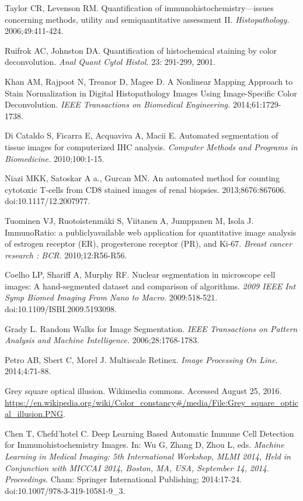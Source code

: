 \documentclass[12pt]{article}
\begin{document}
\noindent[24] Taylor CR, Levenson RM. Quantification of immunohistochemistry---issues concerning methods,
utility and semiquantitative assessment II. \textit{Histopathology.} 2006;49:411-424.

\noindent[25] Ruifrok AC, Johnston DA. Quantification of histochemical staining by color deconvolution. \textit{Anal
Quant Cytol Histol.} 23: 291-299, 2001.

\noindent[26] Khan AM, Rajpoot N, Treanor D, Magee D. A Nonlinear Mapping Approach to Stain
Normalization in Digital Histopathology Images Using Image-Specific Color Deconvolution. \textit{IEEE
Transactions on Biomedical Engineering.} 2014;61:1729-1738.

\noindent[27] Di Cataldo S, Ficarra E, Acquaviva A, Macii E. Automated segmentation of tissue images for
computerized IHC analysis. \textit{Computer Methods and Programs in Biomedicine.} 2010;100:1-15.

\noindent[28] Niazi MKK, Satoskar A a., Gurcan MN. An automated method for counting cytotoxic T-cells
from CD8 stained images of renal biopsies. 2013;8676:867606. doi:10.1117/12.2007977.

\noindent[29] Tuominen VJ, Ruotoistenmäki S, Viitanen A, Jumppanen M, Isola J. ImmunoRatio: a publiclyavailable web application for quantitative image analysis of estrogen receptor (ER), progesterone
receptor (PR), and Ki-67. \textit{Breast cancer research : BCR.} 2010;12:R56-R56.

\noindent[30] Coelho LP, Shariff A, Murphy RF. Nuclear segmentation in microscope cell images: A hand-segmented dataset and comparison of algorithms. \textit{2009 IEEE Int Symp Biomed Imaging From Nano to Macro.} 2009:518-521. doi:10.1109/ISBI.2009.5193098.

\noindent[31] Grady L. Random Walks for Image Segmentation. \textit{IEEE Transactions on Pattern Analysis and
Machine Intelligence.} 2006;28:1768-1783.

\noindent[32] Petro AB, Sbert C, Morel J. Multiscale Retinex. \textit{Image Processing On Line.} 2014;4:71-88.

\noindent[33] Grey square optical illusion. Wikimedia commons. Accessed August 25, 2016. \url{https://en.wikipedia.org/wiki/Color_constancy#/media/File:Grey_square_optical_illusion.PNG}. 

\noindent[34] Chen T, Chefd’hotel C. Deep Learning Based Automatic Immune Cell Detection for
Immunohistochemistry Images. In: Wu G, Zhang D, Zhou L, eds. \textit{Machine Learning in Medical
Imaging: 5th International Workshop, MLMI 2014, Held in Conjunction with MICCAI 2014, Boston,
MA, USA, September 14, 2014. Proceedings.} Cham: Springer International Publishing; 2014:17-24. 
doi:10.1007/978-3-319-10581-9\_3.
\end{document}
